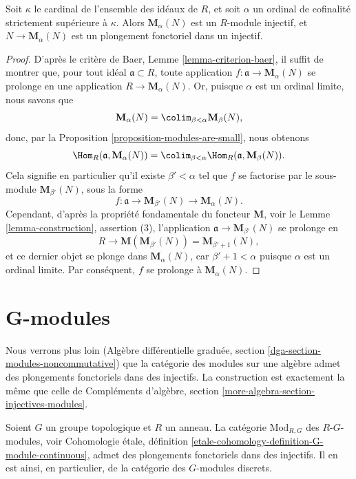 \begin{theorem}
\label{theorem-baer-grothendieck}
Soit $\kappa$ le cardinal de l'ensemble des idéaux de $R$, et soit $\alpha$
un ordinal de cofinalité strictement supérieure à $\kappa$. Alors
$\mathbf{M}_\alpha(N)$ est un $R$-module injectif, et
$N \to \mathbf{M}_\alpha(N)$ est un plongement fonctoriel dans un injectif.
\end{theorem}

\begin{proof}
D'après le critère de Baer, Lemme \ref{lemma-criterion-baer}, il suffit de
montrer que, pour tout idéal $\mathfrak{a} \subset R$, toute application
$f : \mathfrak{a} \to \mathbf{M}_\alpha(N)$ se prolonge en une application
$R \to \mathbf{M}_\alpha(N)$. Or, puisque $\alpha$ est un ordinal limite, nous
savons que
$$
\mathbf{M}_{\alpha}(N) =
\colim_{\beta < \alpha} \mathbf{M}_{\beta}(N),
$$
donc, par la Proposition \ref{proposition-modules-are-small}, nous obtenons
$$
\Hom_R(\mathfrak{a}, \mathbf{M}_{\alpha}(N)) =
\colim_{\beta < \alpha} \Hom_R(\mathfrak a, \mathbf{M}_{\beta}(N)).
$$
Cela signifie en particulier qu'il existe $\beta' < \alpha$ tel que $f$ se
factorise par le sous-module $\mathbf{M}_{\beta'}(N)$, sous la forme
$$
f : \mathfrak{a} \to \mathbf{M}_{\beta'}(N) \to
\mathbf{M}_{\alpha}(N).
$$
Cependant, d'après la propriété fondamentale du foncteur $\mathbf{M}$, voir le
Lemme \ref{lemma-construction}, assertion (3), l'application
$\mathfrak{a} \to \mathbf{M}_{\beta'}(N)$ se prolonge en
$$
R \to \mathbf{M}( \mathbf{M}_{\beta'}(N)) =
\mathbf{M}_{\beta' + 1}(N),
$$
et ce dernier objet se plonge dans $\mathbf{M}_{\alpha}(N)$, car
$\beta' + 1 < \alpha$ puisque $\alpha$ est un ordinal limite. Par conséquent,
$f$ se prolonge à $\mathbf{M}_{\alpha}(N)$.
\end{proof}




\section{G-modules}
\label{section-G-modules}

\noindent
Nous verrons plus loin (Algèbre différentielle graduée, section
\ref{dga-section-modules-noncommutative}) que la catégorie des modules sur une
algèbre admet des plongements fonctoriels dans des injectifs. La construction est
exactement la même que celle de
Compléments d'algèbre, section
\ref{more-algebra-section-injectives-modules}.

\begin{lemma}
\label{lemma-G-modules}
Soient $G$ un groupe topologique et $R$ un anneau. La catégorie
$\text{Mod}_{R, G}$ des $R\text{-}G$-modules, voir Cohomologie étale,
définition \ref{etale-cohomology-definition-G-module-continuous}, admet des
plongements fonctoriels dans des injectifs. Il en est ainsi, en particulier, de la
catégorie des $G$-modules discrets.
\end{lemma}

